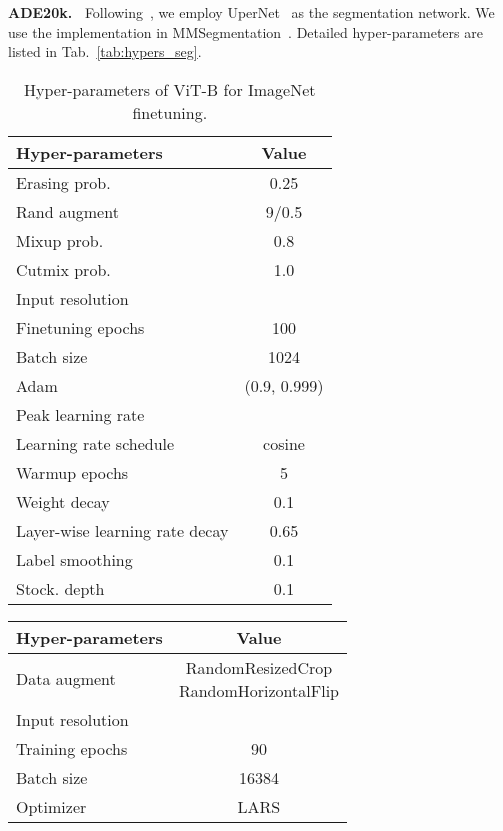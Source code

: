 \documentclass[10pt,twocolumn,letterpaper]{article}
\begin{document}
\vspace{0.5em}\noindent\textbf{ADE20k.~} Following~\cite{bao2021beit,he2022masked,anonymous2022siamese}, we employ UperNet~\cite{xiao2018unified} as the segmentation network. We use the implementation in MMSegmentation~\cite{mmseg2020}. Detailed hyper-parameters are listed in Tab.~\ref{tab:hypers_seg}.

\begin{table}[h]
    \centering
    \small
    \begin{tabular}{lc}
    \toprule
        Hyper-parameters & Value \\
    \midrule
        Erasing prob. & 0.25 \\
        Rand augment & 9/0.5 \\
        Mixup prob. & 0.8 \\
        Cutmix prob. & 1.0 \\
        Input resolution &  \\
    \midrule
        Finetuning epochs & 100 \\
        Batch size & 1024 \\
        Adam  & (0.9, 0.999) \\
        Peak learning rate & \\
        Learning rate schedule & cosine \\
        Warmup epochs & 5 \\
        Weight decay & 0.1 \\
        Layer-wise learning rate decay & 0.65 \\
        Label smoothing & 0.1 \\
        Stock. depth & 0.1 \\
    \bottomrule
    \end{tabular}
    \caption{Hyper-parameters of ViT-B for ImageNet finetuning.}
    \label{tab:hypers_finetune}
\end{table} \begin{table}[h]
    \centering
    \small
    \begin{tabular}{lc}
    \toprule
        Hyper-parameters & Value \\
    \midrule
        Data augment & \makecell{RandomResizedCrop\\RandomHorizontalFlip} \\
        Input resolution &  \\
    \midrule
        Training epochs & 90 \\
        Batch size & 16384 \\
        Optimizer & LARS \\

\end{tabular}
\end{table}
\end{document}
